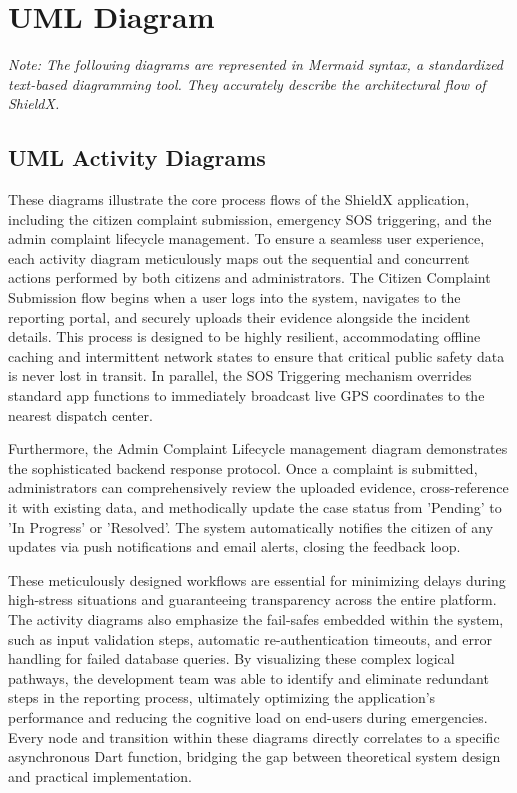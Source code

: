 \documentclass[12pt, a4paper, twoside, openany]{report}
\begin{document}
\section{UML Diagram}
\textit{Note: The following diagrams are represented in Mermaid syntax, a standardized text-based diagramming tool. They accurately describe the architectural flow of ShieldX.}
\subsection{UML Activity Diagrams}
These diagrams illustrate the core process flows of the ShieldX application, including the citizen complaint submission, emergency SOS triggering, and the admin complaint lifecycle management. To ensure a seamless user experience, each activity diagram meticulously maps out the sequential and concurrent actions performed by both citizens and administrators. The Citizen Complaint Submission flow begins when a user logs into the system, navigates to the reporting portal, and securely uploads their evidence alongside the incident details. This process is designed to be highly resilient, accommodating offline caching and intermittent network states to ensure that critical public safety data is never lost in transit. In parallel, the SOS Triggering mechanism overrides standard app functions to immediately broadcast live GPS coordinates to the nearest dispatch center. 

Furthermore, the Admin Complaint Lifecycle management diagram demonstrates the sophisticated backend response protocol. Once a complaint is submitted, administrators can comprehensively review the uploaded evidence, cross-reference it with existing data, and methodically update the case status from 'Pending' to 'In Progress' or 'Resolved'. The system automatically notifies the citizen of any updates via push notifications and email alerts, closing the feedback loop. 

These meticulously designed workflows are essential for minimizing delays during high-stress situations and guaranteeing transparency across the entire platform. The activity diagrams also emphasize the fail-safes embedded within the system, such as input validation steps, automatic re-authentication timeouts, and error handling for failed database queries. By visualizing these complex logical pathways, the development team was able to identify and eliminate redundant steps in the reporting process, ultimately optimizing the application's performance and reducing the cognitive load on end-users during emergencies. Every node and transition within these diagrams directly correlates to a specific asynchronous Dart function, bridging the gap between theoretical system design and practical implementation.
\end{document}
